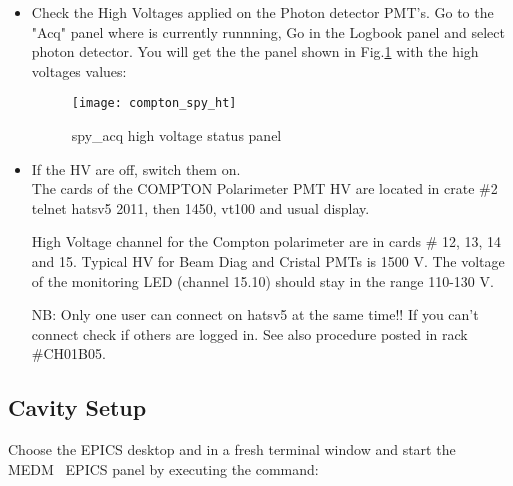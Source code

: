 {\begin{itemize}
In a fresh terminal window, excecute the command to start 
the spy acqusition control panels\\

\\

Don't be surprised. 7 windows will be open but regroup in only one
        within few seconds. From time to time, it may happen that one window
        does not go inside  window. Click on the corresponding widget.

\item Check the High Voltages applied on the Photon detector PMT's.
Go to the "Acq" panel where  is currently runnning,
Go in the Logbook panel and select photon detector. You will get the 
the  panel shown in Fig.\ref{fig:compton_spy_ht} with the high voltages values:
\begin{figure}[htp]
    \begin{center}
        \texttt{[image: compton\_spy\_ht]}
    \end{center}
    \caption[compton:spy\_acq high voltage]{spy\_acq high voltage status panel }
    \label{fig:compton_spy_ht}
\end{figure}

\item If the HV are off, switch them on.\\
The cards of the COMPTON Polarimeter PMT HV are located in crate \#2
telnet hatsv5 2011, then 1450, vt100 and usual display.

High Voltage channel for the Compton polarimeter are in cards \# 12, 13, 14 and 15.
Typical HV for Beam Diag and Cristal PMTs is 1500 V. The voltage of the monitoring
LED (channel 15.10) should stay in the range 110-130 V.

\par NB: Only one user can connect on hatsv5 at the same time!! If you can't connect
check if others are logged in. See also procedure posted in rack \#CH01B05.
\end{itemize}

\newpage
\subsection{Cavity Setup}
Choose the EPICS desktop and in a fresh terminal window and start the MEDM~\cite{MEDMwww} EPICS panel 
 by executing  the command:\\

\\

}
